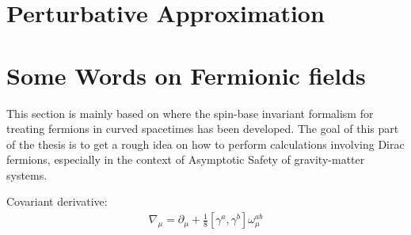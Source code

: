 \section{Perturbative Approximation}

\section{Some Words on Fermionic fields}
This section is mainly based on \cite{LippoldtPHD}  where the spin-base invariant formalism for treating fermions in curved spacetimes has been developed. The goal of this part of the thesis is to get a rough idea on how to perform calculations involving Dirac fermions, especially in the context of Asymptotic Safety of gravity-matter systems.  

Covariant derivative:
\begin{align}
	\nabla_{\mu} = \partial_{\mu} + \frac{1}{8}\left[\gamma^{a}, \gamma^{b}\right]\omega_{\mu}^{ab}
\end{align}


